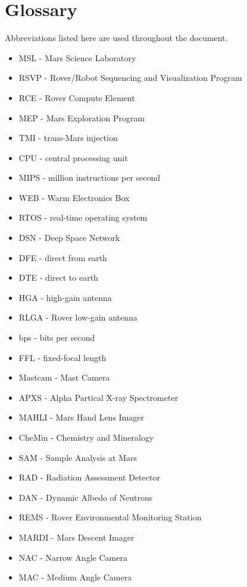 \chapter*{Glossary}

Abbreviations listed here are used throughout the document.

\begin{itemize}
\item MSL - Mars Science Laboratory
\item RSVP - Rover/Robot Sequencing and Visualization Program
\item RCE - Rover Compute Element
\item MEP - Mars Exploration Program
\item TMI - trans-Mars injection
\item CPU - central processing unit
\item MIPS - million instructions per second
\item WEB - Warm Electronics Box
\item RTOS - real-time operating system
\item DSN - Deep Space Network
\item DFE - direct from earth
\item DTE - direct to earth
\item HGA - high-gain antenna
\item RLGA - Rover low-gain antenna
\item bps - bits per second
\item FFL - fixed-focal length
\item Mastcam - Mast Camera
\item APXS - Alpha Partical X-ray Spectrometer
\item MAHLI - Mars Hand Lens Imager
\item CheMin - Chemistry and Mineralogy
\item SAM - Sample Analysis at Mars
\item RAD - Radiation Assessment Detector
\item DAN - Dynamic Albedo of Neutrons
\item REMS - Rover Environmental Monitoring Station
\item MARDI - Mars Descent Imager
\item NAC - Narrow Angle Camera
\item MAC - Medium Angle Camera
\end{itemize}
